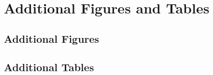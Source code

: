 \documentclass[11pt,a4paper,oneside]{article}
\begin{document}

 

\pagebreak

\appendix \label{appendix-all}
\renewcommand{\thefigure}{A.\arabic{figure}}
\setcounter{figure}{0}

\section{Additional Figures and Tables}

\subsection*{Additional Figures}
\pagebreak
\subsection*{Additional Tables}
\renewcommand{\thetable}{A.\arabic{table}}
\setcounter{table}{0}
\setcounter{figure}{0}
\end{document}
